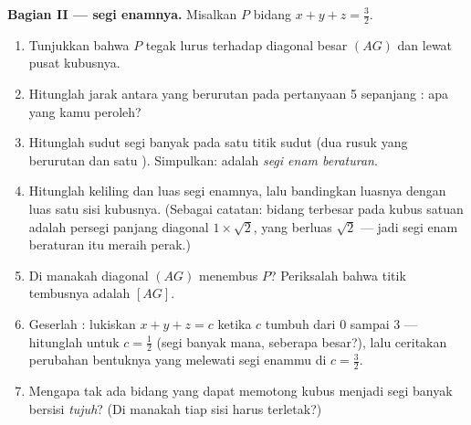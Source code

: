 \begin{problem}
\medskip
\noindent\textbf{Bagian II ---  segi enamnya.}
Misalkan $P$ bidang $x + y + z = \frac32$.
\begin{enumerate}[resume]
  \item Tunjukkan bahwa $P$ tegak lurus terhadap diagonal besar
        $(AG)$ dan lewat pusat kubusnya.
  \item Hitunglah jarak antara  yang berurutan pada
        pertanyaan 5 sepanjang : apa yang kamu peroleh?
  \item Hitunglah sudut segi banyak  pada satu
        titik sudut (dua  rusuk yang berurutan dan satu ). Simpulkan:  adalah \emph{segi enam
        beraturan}.
  \item Hitunglah keliling dan luas segi enamnya, lalu bandingkan
        luasnya dengan luas satu sisi kubusnya. (Sebagai
        catatan:  bidang terbesar pada kubus satuan adalah
        persegi panjang diagonal $1 \times \sqrt2$, yang berluas
        $\sqrt2$ --- jadi segi enam beraturan itu meraih perak.)
  \item Di manakah diagonal $(AG)$ menembus $P$? Periksalah bahwa
        titik tembusnya adalah  $[AG]$.
  \item Geserlah : lukiskan 
        $x + y + z = c$ ketika $c$ tumbuh dari $0$ sampai $3$ ---
        hitunglah  untuk $c = \frac12$ (segi banyak mana,
        seberapa besar?), lalu ceritakan perubahan bentuknya yang melewati
        segi enammu di $c = \frac32$.
  \item Mengapa tak ada bidang yang dapat memotong kubus menjadi segi banyak
        bersisi \emph{tujuh}? (Di manakah tiap sisi 
        harus terletak?)
\end{enumerate}


\end{problem}
